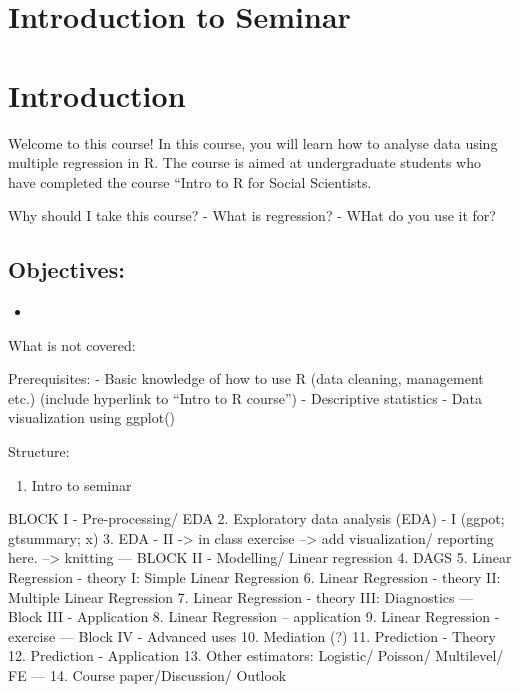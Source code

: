 \documentclass[
]{book}
\providecommand{\tightlist}{%
  \setlength{\itemsep}{0pt}\setlength{\parskip}{0pt}}
\begin{document}
\hypertarget{intro-sem}{%
\chapter{Introduction to Seminar}\label{intro-sem}}

\hypertarget{introduction}{%
\chapter{Introduction}\label{introduction}}

Welcome to this course! In this course, you will learn how to analyse data using multiple regression in R. The course is aimed at undergraduate students who have completed the course ``Intro to R for Social Scientists.

Why should I take this course?
- What is regression?
- WHat do you use it for?

\hypertarget{objectives}{%
\section{Objectives:}\label{objectives}}

\begin{itemize}
\tightlist
\item
\end{itemize}

What is not covered:

Prerequisites:
- Basic knowledge of how to use R (data cleaning, management etc.) (include hyperlink to ``Intro to R course'')
- Descriptive statistics
- Data visualization using ggplot()

Structure:

\begin{enumerate}
\def\labelenumi{\arabic{enumi}.}
\tightlist
\item
  Intro to seminar
\end{enumerate}

BLOCK I - Pre-processing/ EDA
2. Exploratory data analysis (EDA) - I (ggpot; gtsummary; x)
3. EDA - II -\textgreater{} in class exercise
--\textgreater{} add visualization/ reporting here.
--\textgreater{} knitting
---
BLOCK II - Modelling/ Linear regression
4. DAGS
5. Linear Regression - theory I: Simple Linear Regression
6. Linear Regression - theory II: Multiple Linear Regression
7. Linear Regression - theory III: Diagnostics
---
Block III - Application
8. Linear Regression -- application
9. Linear Regression - exercise
---
Block IV - Advanced uses
10. Mediation (?)
11. Prediction - Theory
12. Prediction - Application
13. Other estimators: Logistic/ Poisson/ Multilevel/ FE
---
14. Course paper/Discussion/ Outlook
\end{document}
